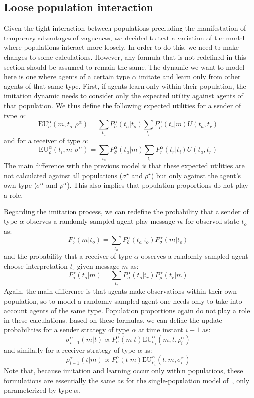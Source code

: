 \documentclass[a4paper]{article}
\begin{document}
\subsection{Loose population interaction}
\label{sec:loose-interaction-model}
Given the tight interaction between populations precluding the manifestation of temporary advantages of vagueness, we decided to test a variation of the model where populations interact more loosely.
In order to do this, we need to make changes to some calculations.
However, any formula that is not redefined in this section should be assumed to remain the same.
The dynamic we want to model here is one where agents of a certain type $\alpha$ imitate and learn only from other agents of that same type.
First, if agents learn only within their population, the imitation dynamic needs to consider only the expected utility against agents of that population.
We thus define the following expected utilities for a sender of type $\alpha$:
$$
\text{EU}_{\sigma}^{\alpha}(m,t_{o},\rho^{\alpha})=\sum_{t_{a}}P_{\bar{o}}^{\alpha}(t_{a}|t_{o})\sum_{t_{r}}P_{\rho}^{\alpha}(t_{r}|m)U(t_{a},t_{r})
$$
and for a receiver of type $\alpha$:
$$
\text{EU}_{\rho}^{\alpha}(t_{i},m,\sigma^{\alpha})=\sum_{t_{a}}P_{\bar{\sigma}}^{\alpha}(t_{a}|m)\sum_{t_{r}}P_{r}^{\alpha}(t_{r}|t_{i})U(t_{a},t_{r})
$$
The main difference with the previous model is that these expected utilities are not calculated against all populations ($\sigma^\star$ and $\rho^\star$) but only against the agent's own type ($\sigma^\alpha$ and $\rho^\alpha$).
This also implies that population proportions do not play a role.

Regarding the imitation process, we can redefine the probability that a sender of type $\alpha$ observes a randomly sampled agent play message $m$ for observed state $t_o$ as:
$$
P_{o}^{\alpha}(m|t_{o})=\sum_{t_{a}}P_{\bar{o}}^{\alpha}(t_{a}|t_{o})P_{\sigma}^{\alpha}(m|t_{a})
$$
and the probability that a receiver of type $\alpha$ observes a randomly sampled agent choose interpretation $t_o$ given message $m$ as:
$$
P_{o}^{\alpha}(t_{o}|m)=\sum_{t_{r}}P_{o}^{\alpha}(t_{o}|t_{r})P_{\rho}^{\alpha}(t_{r}|m)
$$
Again, the main difference is that agents make observations within their own population, so to model a randomly sampled agent one needs only to take into account agents of the same type.
Population proportions again do not play a role in these calculations.
Based on these formulas, we can define the update probabilities for a sender strategy of type $\alpha$ at time instant $i+1$ as:
$$
\sigma_{i+1}^{\alpha}(m|t) \propto P_{o}^{\alpha}(m|t)\text{EU}_{\sigma_{i}}^{\alpha}(m,t,\rho_{i}^{\alpha})
$$
and similarly for a receiver strategy of type $\alpha$ as:
$$
\rho_{i+1}^{\alpha}(t|m) \propto P_{o}^{\alpha}(t|m)\text{EU}_{\rho_{i}}^{\alpha}(t,m,\sigma_{i}^{\alpha})
$$
Note that, because imitation and learning occur only within populations, these formulations are essentially the same as for the single-population model of~\textcite{franke_vagueness_2017}, only parameterized by type $\alpha$.
\end{document}
